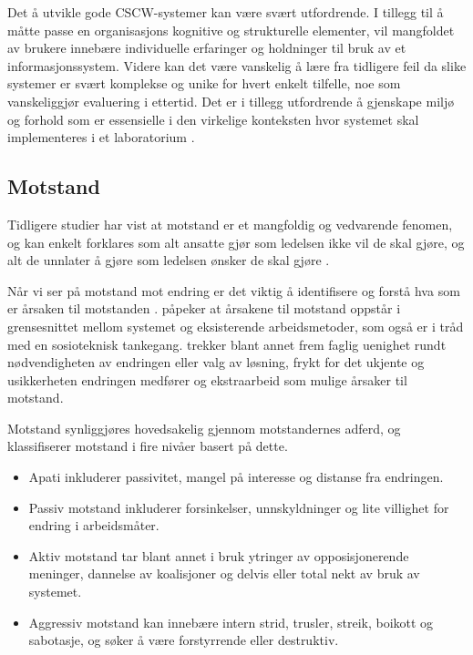 \noindent
Det å utvikle gode CSCW-systemer kan være svært utfordrende. I tillegg til å måtte passe en organisasjons kognitive og strukturelle elementer, vil mangfoldet av brukere innebære individuelle erfaringer og holdninger til bruk av et informasjonssystem. Videre kan det være vanskelig å lære fra tidligere feil da slike systemer er svært komplekse og unike for hvert enkelt tilfelle, noe som vanskeliggjør evaluering i ettertid. Det er i tillegg utfordrende å gjenskape miljø og forhold som er essensielle i den virkelige konteksten hvor systemet skal implementeres i et laboratorium \citep{Berg99}.

\subsection{Motstand}
\label{sec:motstand}
Tidligere studier har vist at motstand er et mangfoldig og vedvarende fenomen, og kan enkelt forklares som alt ansatte gjør som ledelsen ikke vil de skal gjøre, og alt de unnlater å gjøre som ledelsen ønsker de skal gjøre \citep{Timmons03}.
 
\noindent
Når vi ser på motstand mot endring er det viktig å identifisere og forstå hva som er årsaken til motstanden \citep{Lapointe05}. \citet{Timmons03} påpeker at årsakene til motstand oppstår i grensesnittet mellom systemet og eksisterende arbeidsmetoder, som også er i tråd med en sosioteknisk tankegang. \citet{Jacobsen12} trekker blant annet frem faglig uenighet rundt nødvendigheten av endringen eller valg av løsning, frykt for det ukjente og usikkerheten endringen medfører og ekstraarbeid som mulige årsaker til motstand.
 
\noindent
Motstand synliggjøres hovedsakelig gjennom motstandernes adferd, og \citet{Lapointe05} klassifiserer motstand i fire nivåer basert på dette.
 
\begin{itemize}
\item Apati inkluderer passivitet, mangel på interesse og distanse fra endringen.
\item Passiv motstand inkluderer forsinkelser, unnskyldninger og lite villighet for endring i arbeidsmåter.
\item Aktiv motstand tar blant annet i bruk ytringer av opposisjonerende meninger, dannelse av koalisjoner og delvis eller total nekt av bruk av systemet.
\item Aggressiv motstand kan innebære intern strid, trusler, streik, boikott og sabotasje, og søker å være forstyrrende eller destruktiv.
\end{itemize}
 
